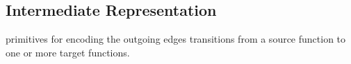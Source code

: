 \subsection{\name{} Intermediate Representation}\label{sec:ir}


primitives for encoding the outgoing edges transitions from a source function
to one or more target functions.


